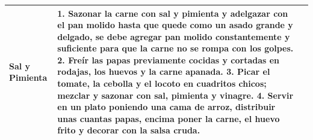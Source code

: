 \documentclass[menu.tex]{subfiles}
\begin{document}
\begin{tabular} {p{3.5cm} p{4cm} p{9cm}}
\begin{compactitem}
\begin{footnotesize}
                \item Sal y Pimienta
            \end{footnotesize}
        \end{compactitem}&
        \vspace{-1.8cm}
        1. Sazonar la carne con sal y pimienta y adelgazar con el pan molido hasta que quede como un asado grande y delgado, se debe agregar pan molido constantemente y suficiente para que la carne no se rompa con los golpes. 
        2. Freír las papas previamente cocidas y cortadas en rodajas, los huevos y la carne apanada.
        3. Picar el tomate, la cebolla y el locoto en cuadritos chicos; mezclar y sazonar con sal, pimienta y vinagre.
        4. Servir en un plato poniendo una cama de arroz, distribuir unas cuantas papas, encima poner la carne, el huevo frito y decorar con la salsa cruda. \\
        \hline
        

\end{tabular}
\end{document}
